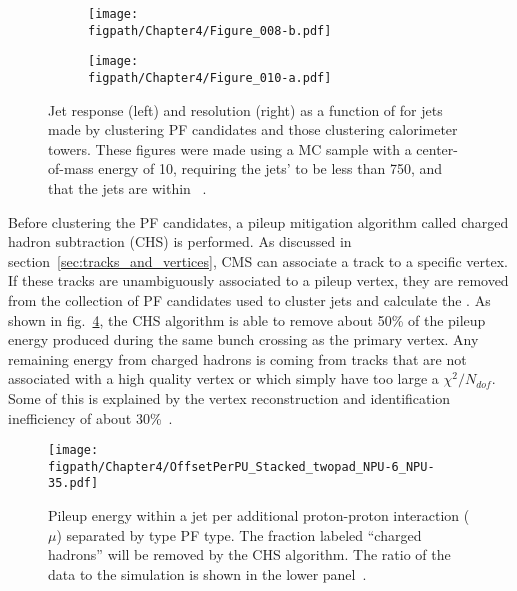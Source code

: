 \begin{figure}[!hbt]
    \centering
    \begin{subfigure}[t]{0.48\textwidth}
        \texttt{[image: \\figpath/Chapter4/Figure\_008-b.pdf]}
        \caption{}
        \label{fig:PFVsCaloJetResponse}
    \end{subfigure}
    \begin{subfigure}[t]{0.48\textwidth}
        \texttt{[image: \\figpath/Chapter4/Figure\_010-a.pdf]}
        \caption{}
        \label{fig:PFVsCaloJetResolution}
    \end{subfigure}
    \caption{Jet response (left) and resolution (right) as a function of \pt for jets made by clustering PF candidates and those clustering calorimeter towers. These figures were made using a MC sample with a center-of-mass energy of 10\tev, requiring the jets' \pt to be less than 750\gev, and that the jets are within ~\cite{CMS-PAS-PFT-09-001}.}
\end{figure}

Before clustering the PF candidates, a pileup mitigation algorithm called charged hadron subtraction (CHS) is performed. As discussed in section~\ref{sec:tracks_and_vertices}, CMS can associate a track to a specific vertex. If these tracks are unambiguously associated to a pileup vertex, they are removed from the collection of PF candidates used to cluster jets and calculate the \VETslash. As shown in fig.~\ref{fig:PFJet_PileupComposition}, the CHS algorithm is able to remove about 50\% of the pileup energy produced during the same bunch crossing as the primary vertex. Any remaining energy from charged hadrons is coming from tracks that are not associated with a high quality vertex or which simply have too large a $\chi^{2}/N_{dof}$. Some of this is explained by the vertex reconstruction and identification inefficiency of about 30\%~\cite{Khachatryan:2198719}.

\begin{figure}[!hbt]
    \centering
    \texttt{[image: \\figpath/Chapter4/OffsetPerPU\_Stacked\_twopad\_NPU-6\_NPU-35.pdf]}
    \caption{Pileup energy within a jet per additional proton-proton interaction ($\mu$) separated by type PF type. The fraction labeled ``charged hadrons'' will be removed by the CHS algorithm. The ratio of the data to the simulation is shown in the lower panel~\cite{Khachatryan:2198719}.}
    \label{fig:PFJet_PileupComposition}
\end{figure}

